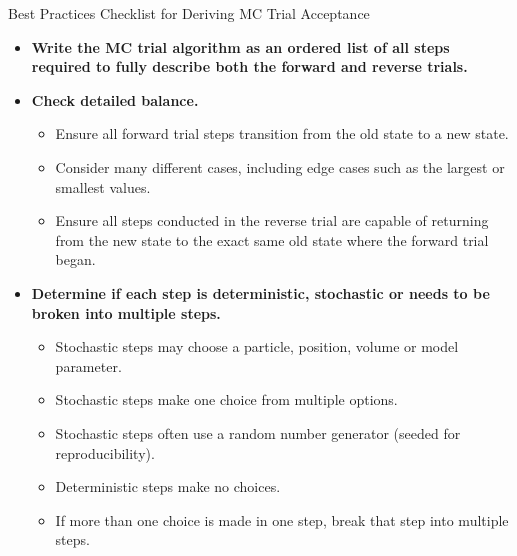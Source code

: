 \documentclass[
  9pt,
  bestpractices,
  pubversion,
]{livecoms}
\begin{document}
\begin{Checklists*}[p!]
\begin{checklist}{Best Practices Checklist for Deriving MC Trial Acceptance}
\begin{itemize}
\item
  \textbf{Write the MC trial algorithm as an ordered list of all steps required to fully describe both the forward and reverse trials.}

\item
  \textbf{Check detailed balance.}
  \begin{itemize}
    \item Ensure all forward trial steps transition from the old state to a new state.
    \item Consider many different cases, including edge cases such as the largest or smallest values.
    \item Ensure all steps conducted in the reverse trial are capable of returning from the new state to the exact same old state where the forward trial began.
  \end{itemize}

\item
  \textbf{Determine if each step is deterministic, stochastic or needs to be broken into multiple steps.}
  \begin{itemize}
    \item Stochastic steps may choose a particle, position, volume or model parameter.
    \item Stochastic steps make one choice from multiple options.
    \item Stochastic steps often use a random number generator (seeded for reproducibility).
    \item Deterministic steps make no choices.
    \item If more than one choice is made in one step, break that step into multiple steps.
  \end{itemize}


\end{itemize}
\end{checklist}
\end{Checklists*}
\end{document}
